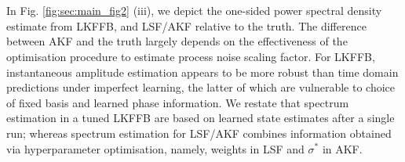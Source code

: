 \\ 
\\
In Fig. \ref{fig:sec:main_fig2} (iii), we depict the one-sided power spectral density estimate from LKFFB, and LSF/AKF relative to the truth. The difference between AKF and the truth largely depends on the effectiveness of the optimisation procedure to estimate process noise scaling factor. For LKFFB, instantaneous amplitude estimation appears to be more robust than time domain predictions under imperfect learning, the latter of which are vulnerable to choice of fixed basis and learned phase information.  We restate that spectrum estimation in a tuned LKFFB are based on learned state estimates after a single run; whereas spectrum estimation for LSF/AKF combines information obtained via hyperparameter optimisation, namely, weights in LSF and $\sigma^*$ in AKF.
